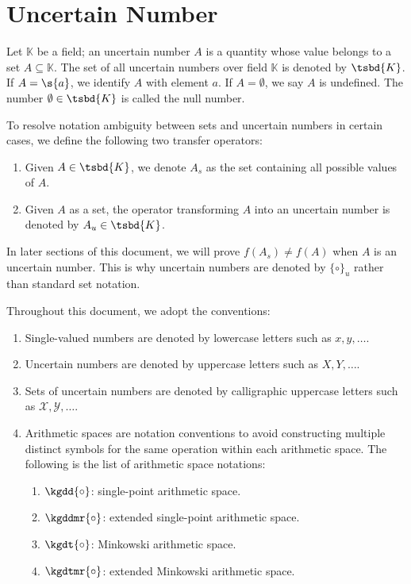 \section{Uncertain Number}
\begin{definition}
	Let $\mathbb{K}$ be a field; an uncertain number $A$ is a quantity whose value belongs to a set $A \subseteq \mathbb{K}$. The set of all uncertain numbers over field $\mathbb{K}$ is denoted by $\tsbd{K}$. If $A =\s{a}$, we identify $A$ with element $a$. If $A =\emptyset$, we say $A$ is undefined. The number $\emptyset \in \tsbd{K}$ is called the null number.
\end{definition}
\begin{definition}
	To resolve notation ambiguity between sets and uncertain numbers in certain cases, we define the following two transfer operators:
	\begin{enumerate}
		\item Given $A \in \tsbd{K}$, we denote $A_s$ as the set containing all possible values of $A$.
		\item Given $A$ as a set, the operator transforming $A$ into an uncertain number is denoted by $A_u \in \tsbd{K}$.
	\end{enumerate}
\end{definition}
\begin{remark}
	In later sections of this document, we will prove $f(A_s) \neq f(A)$ when $A$ is an uncertain number. This is why uncertain numbers are denoted by $\{\circ\}_u$ rather than standard set notation.
\end{remark}
\begin{remark}
	Throughout this document, we adopt the conventions:
	\begin{enumerate}[leftmargin=*]
		\item Single-valued numbers are denoted by lowercase letters such as $x, y, \dots$.
		\item Uncertain numbers are denoted by uppercase letters such as $X, Y, \dots$.
		\item Sets of uncertain numbers are denoted by calligraphic uppercase letters such as $\mathcal{X}, \mathcal{Y}, \dots$.
		\item Arithmetic spaces are notation conventions to avoid constructing multiple distinct symbols for the same operation within each arithmetic space. The following is the list of arithmetic space notations:
		\begin{enumerate}
			\item $\kgdd{\circ}$: single-point arithmetic space.
			\item $\kgddmr{\circ}$: extended single-point arithmetic space.
			\item $\kgdt{\circ}$: Minkowski arithmetic space.
			\item $\kgdtmr{\circ}$: extended Minkowski arithmetic space.
		\end{enumerate}
	\end{enumerate}
\end{remark}
